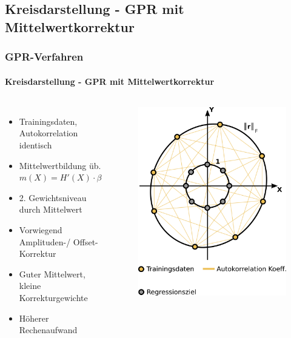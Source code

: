 \documentclass{beamer}
\begin{document}
\subsection{Kreisdarstellung - GPR mit Mittelwertkorrektur}
\begin{frame}
\frametitle{GPR-Verfahren}
\framesubtitle{Kreisdarstellung - GPR mit Mittelwertkorrektur}
\begin{columns}[c]
	\begin{itemize}
		\item<1-> Trainingsdaten, Autokorrelation identisch
		\item<2-> Mittelwertbildung üb. $m(X)=H'(X) \cdot \beta$
		\item<3-> 2. Gewichtsniveau durch Mittelwert
		\item<3-> Vorwiegend Amplituden-/ Offset-Korrektur
		\item<4-> Guter Mittelwert, kleine Korrekturgewichte
		\item<4-> Höherer Rechenaufwand
	\end{itemize}
	\begin{figure}
		\begin{overprint}
			\includegraphics[width=\linewidth]{images/GPR_Mapping_Mean-1}

\end{overprint}
\end{figure}
\end{columns}
\end{frame}
\end{document}

